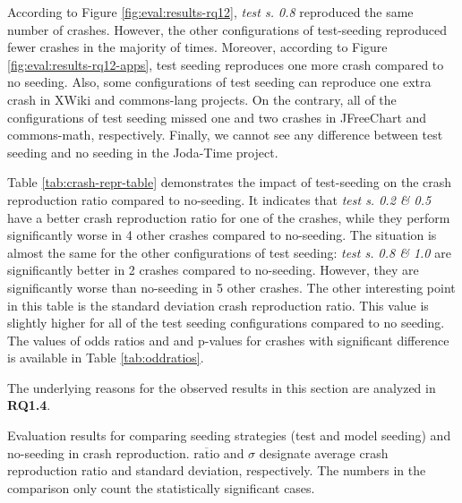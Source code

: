 According to Figure \ref{fig:eval:results-rq12}, \textit{test s. 0.8} reproduced the same number of crashes. However, the other configurations of test-seeding reproduced fewer crashes in the majority of times. Moreover, according to Figure \ref{fig:eval:results-rq12-apps}, test seeding reproduces one more crash compared to no seeding. Also, some configurations of test seeding can reproduce one extra crash in  XWiki and commons-lang projects. On the contrary, all of the configurations of test seeding missed one and two crashes in JFreeChart and commons-math, respectively. Finally, we cannot see any difference between test seeding and no seeding in the Joda-Time project.
 
 

Table \ref{tab:crash-repr-table} demonstrates the impact of test-seeding on the crash reproduction ratio compared to no-seeding. It indicates that \textit{test s. 0.2 \& 0.5} have a better crash reproduction ratio for one of the crashes, while they perform significantly worse in 4 other crashes compared to no-seeding. The situation is almost the same for the other configurations of test seeding: \textit{test s. 0.8 \& 1.0} are significantly better in 2 crashes compared to no-seeding. However, they are significantly worse than no-seeding in 5 other crashes. The other interesting point in this table is the standard deviation crash reproduction ratio. This value is slightly higher for all of the test seeding configurations compared to no seeding. The values of odds ratios and and p-values for crashes with significant difference is available in Table \ref{tab:oddratios}.

The underlying reasons for the observed results in this section are analyzed in \textbf{RQ1.4}.



\begin{table} [t]
	\center
	\caption{Evaluation results for comparing seeding strategies (test and model seeding) and no-seeding in crash reproduction. $\overline{\text{ratio}}$ and $\sigma$  designate average crash reproduction ratio and standard deviation, respectively. The numbers in the comparison only count the statistically significant cases.}
	\label{tab:crash-repr-table}
	\begin{footnotesize}
	\subfloat{}
	\subfloat{}
	
    \end{footnotesize}
\end{table}

